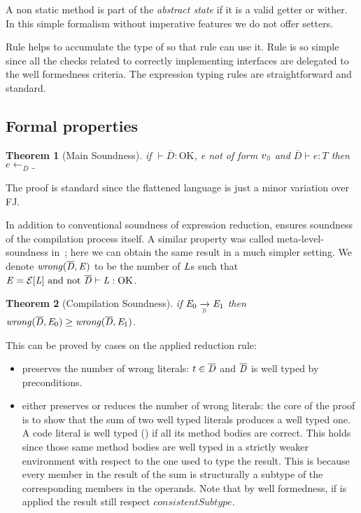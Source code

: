 \noindent A non static method is part of the \emph{abstract state} if 
it is a valid getter or wither. In this simple formalism without imperative features we do not offer setters.


Rule  helps to accumulate the type of \Q@this@ so that rule 
can use it.
Rule  is so simple since all the checks
related to correctly implementing interfaces are delegated to the well formedness criteria.
The expression typing rules are straightforward and standard.


\subsection{Formal properties}

\newtheorem{theorem}{Theorem}[section]
\begin{theorem}[Main Soundness]
if $\vdash\overline{D}:\text{OK}$,
e not of form $v_{{\smallDs}}$
and $\overline{D}\vdash e:T$
then
$e\leftarrow_{\overline{D}} \_$
\end{theorem}

\noindent The proof is standard since the flattened language is just a minor variation over FJ.

In addition to conventional soundness of expression reduction,
\name ensures soundness of the compilation process itself.
A similar property was called meta-level-soundness in~\cite{servetto2014meta}; here we can obtain the same result in
a much simpler setting.
We denote $\mathit{wrong}(\overline{\mathit{D}},\mathit{E})$ to be the number of $\mathit{L}$s such that
$\mE=\ctx[\mL]\ \text{and not}\ \overline\mD\vdash\mL:\text{OK}$.

\begin{theorem}[Compilation Soundness]

if $\mE_0 \xrightarrow[\smallDs]{} \mE_1$
then $\mathit{wrong}(\overline{\mathit{D}},\mathit{E}_0)\geq\mathit{wrong}(\overline{\mathit{D}},\mathit{E}_1)$.
\end{theorem}

\noindent This can be proved by cases on the applied reduction rule:
\begin{itemize}
\item
{} preserves the number of wrong literals:
$t \in \overline{\mathit{D}}$ and $\overline{\mathit{D}}$ is well typed by  preconditions.
\item {} either preserves or reduces the number of
wrong literals:
the core of the proof is to show that the sum of two well typed literals produces a well typed one.
A code literal is well typed () if all its method bodies are correct.
This holds since those same method bodies
are well typed in a strictly weaker environment with respect to the one used to type the result.
This is because every member in the result of the sum
is structurally a subtype of
the corresponding members in the operands.
Note that by well formedness, if 
is applied the result still respect 
$\mathit{consistentSubtype}$.
\end{itemize}
 
